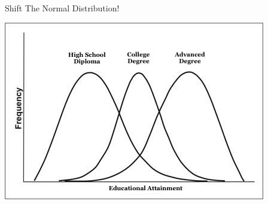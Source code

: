 \documentclass[
  8pt,
  ignorenonframetext,
  dvipsnames]{beamer}
\begin{document}
\begin{frame}{Shift The Normal Distribution!}
\protect\hypertarget{shift-the-normal-distribution}{}

\includegraphics{shifts.jpg}

\end{frame}
\end{document}
